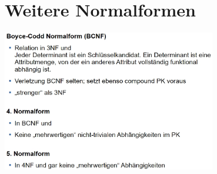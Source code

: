 \documentclass{scrreprt}
\begin{document}
\section{Weitere Normalformen}
\includegraphics[width=0.7\textwidth]{"graphics/weiterNF"}
\end{document}
